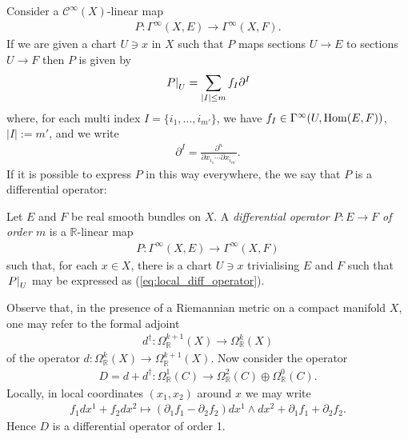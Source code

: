 \documentclass[12pt]{ociamthesis}  %
\begin{document}
Consider a $\mathscr C^\infty(X)$-linear map
\begin{align*}
  P : \Gamma^\infty(X,E) \to \Gamma^\infty(X,F).
\end{align*}
If we are given a chart $U\ni x$ in $X$ such that $P$ maps sections
$U\to E$ to sections $U\to F$ then $P$ is given by
\begin{align}\label{eq:local_diff_operator}
  \left.{P}\right\vert_{U} = \sum_{|I|\leq m} f_I \partial^I 
\end{align}
where, for each multi index $I=\{i_1,\ldots,i_{m'}\}$, we have
$f_I\in\Gamma^\infty(U,\operatorname{Hom}(E,F))$, $|I| := m'$, and we write
\begin{align*}
  \partial^I = \frac{\partial^n}{\partial x_{i_1} \cdots \partial x_{i_{m'}}}.
\end{align*}
If it is possible to express $P$ in this way everywhere,
the we say that $P$ is a differential operator:

\begin{definition}\label{def:diff_operator}
  Let $E$ and $F$ be real smooth bundles on $X$. A \emph{differential
    operator $P:E\to F$ of order $m$} is a $\mathbb R$-linear map
  \begin{align*}
    P : \Gamma^\infty(X,E) \to \Gamma^\infty(X,F)
  \end{align*}
  such that, for each $x\in X$, there is a chart $U\ni x$ trivialising $E$ and
  $F$ such that $\left.{P}\right\vert_{U}$ may be expressed as
  (\ref{eq:local_diff_operator}).
\end{definition}

\begin{example}
  Observe that, in the presence of a Riemannian metric on a compact
  manifold $X$, one may refer to the formal adjoint
  \begin{align*}
    d^\dagger : \Omega^{k+1}_{\mathbb{R}}(X)\to \Omega^{k}_{\mathbb{R}}(X)
  \end{align*}
  of the operator $d : \Omega^k_{\mathbb{R}}(X)\to\Omega^{k+1}_{\mathbb{R}}(X)$.
  Now consider the operator
  \begin{align}\label{eq:d_hat}
    D = d + d^\dagger : \Omega^1_{\mathbb R}(C) \to \Omega^2_{\mathbb R}(C) \oplus \Omega^0_{\mathbb R}(C).
  \end{align}
  Locally, in local coordinates $(x_1,x_2)$ around $x$ we may write
  \begin{align*}
    f_1 dx^1 + f_2 dx^2 \mapsto
    (\partial_1 f_1 - \partial_2 f_2)dx^1\wedge dx^2
    + \partial_1 f_1 + \partial_2 f_2 .
  \end{align*}
  Hence $D$ is a differential operator of order 1.
\end{example}
\end{document}
